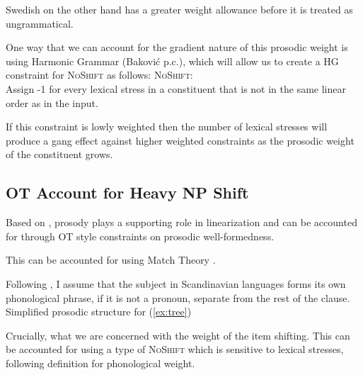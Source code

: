 \documentclass[12pt, letterpaper]{article}
\begin{document}
\ex Swedish on the other hand has a greater weight allowance before it is treated as ungrammatical. 

\ex One way that we can account for the gradient nature of this prosodic weight is using Harmonic Grammar (Baković p.c.), which will allow us to create a HG constraint for \textsc{NoShift} as follows:
	\ea \textsc{NoShift}:\\
	Assign -1 for every lexical stress in a constituent that is not in the same linear order as in the input.
	\z 

\ex If this constraint is lowly weighted then the number of lexical stresses will produce a gang effect against higher weighted constraints as the prosodic weight of the constituent grows. 


\z 

\subsection{OT Account for Heavy NP Shift} \label{sec:HNPS}

\ea Based on \citet{anttilaRoleProsodyEnglish2010}, prosody plays a supporting role in linearization and can be accounted for through OT style constraints on prosodic well-formedness. 

\ex This can be accounted for using Match Theory \citep{selkirkClauseIntonationalPhrase2009,selkirkSyntaxPhonologyInterface2011}.

\ex Following \citet{myrbergSisterhoodProsodicBranching2013,myrbergProsodicWordSwedish2013,myrbergProsodicHierarchySwedish2015}, I assume that the subject in Scandinavian languages forms its own phonological phrase, if it is not a pronoun, separate from the rest of the clause. 
	\ea Simplified prosodic structure for (\ref{ex:tree})\\

	\z

\ex Crucially, what we are concerned with the weight of the item shifting. This can be accounted for using a type of \textsc{NoShift} \citep{bennettLightestRightApparently2016} which is sensitive to lexical stresses, following  definition for phonological weight.
\end{document}
